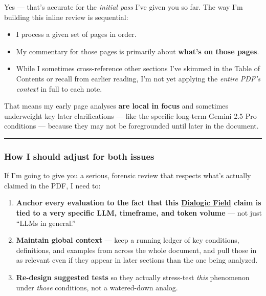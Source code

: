 \documentclass{article}
\begin{document}
Yes --- that's accurate for the \emph{initial pass} I've given you so far. The way I'm building this inline review is sequential:

\begin{itemize}
\item
  I process a given set of pages in order.
\item
  My commentary for those pages is primarily about \textbf{what's on those pages}.
\item
  While I sometimes cross-reference other sections I've skimmed in the Table of Contents or recall from earlier reading, I'm not yet applying the \emph{entire PDF's context} in full to each note.
\end{itemize}

That means my early page analyses \textbf{are local in focus} and sometimes underweight key later clarifications --- like the specific long-term Gemini 2.5 Pro conditions --- because they may not be foregrounded until later in the document.

\begin{center}\rule{0.5\linewidth}{0.5pt}\end{center}

\subsubsection*{\texorpdfstring{\textbf{How I should adjust for both issues}}{How I should adjust for both issues}}\label{how-i-should-adjust-for-both-issues}

If I'm going to give you a serious, forensic review that respects what's actually claimed in the PDF, I need to:

\begin{enumerate}
\item
  \textbf{Anchor every evaluation to the fact that this \hyperlink{gloss:dialogic_field}{Dialogic Field} claim is tied to a very specific LLM, timeframe, and token volume} --- not just ``LLMs in general.''
\item
  \textbf{Maintain global context} --- keep a running ledger of key conditions, definitions, and examples from across the whole document, and pull those in as relevant even if they appear in later sections than the one being analyzed.
\item
  \textbf{Re-design suggested tests} so they actually stress-test \emph{this} phenomenon under \emph{those} conditions, not a watered-down analog.
\end{enumerate}
\end{document}
